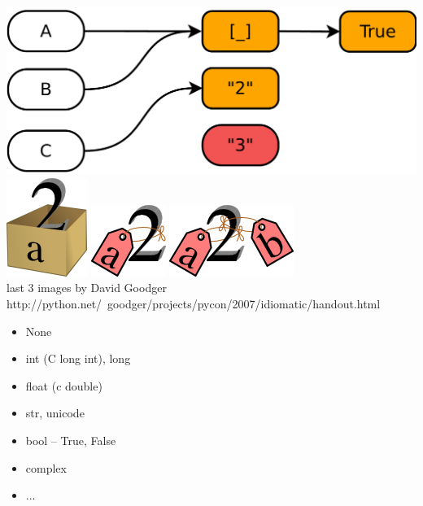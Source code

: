 \documentclass{article}
\begin{document}
\includegraphics[scale=0.4]{images/vars.pdf} \\
\vspace{3cm}
\includegraphics{files/a2box.png} \hspace{3cm}
\includegraphics{files/a2tag.png} \hspace{3cm}
\includegraphics{files/ab2tag.png} \\
\vspace{1cm}
last 3 images by David Goodger \\
http://python.net/~goodger/projects/pycon/2007/idiomatic/handout.html
\newpage

\begin{itemize}
	\item None
	\item int (C long int), long
	\item float (c double)
	\item str, unicode
	\item bool – True, False
	\item complex
	\item ...
\end{itemize}
\newpage
\end{document}
